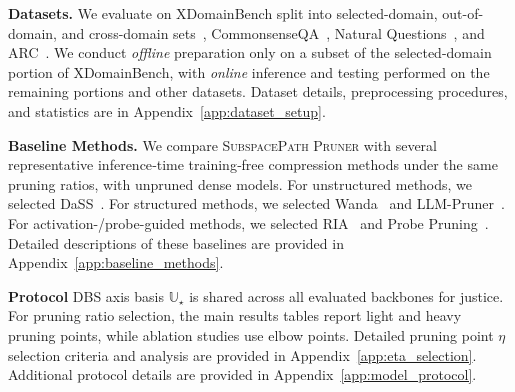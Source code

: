 \textbf{Datasets.}  
We evaluate on XDomainBench split into selected-domain, out-of-domain, and cross-domain sets~\cite{gong2026xdomainbench}, CommonsenseQA~\cite{talmor2019commonsenseqa}, Natural Questions~\cite{kwiatkowski2019natural}, and ARC~\cite{clark2018arc}. We conduct \emph{offline} preparation only on a subset of the selected-domain portion of XDomainBench, with \emph{online} inference and testing performed on the remaining portions and other datasets. Dataset details, preprocessing procedures, and statistics are in Appendix~\ref{app:dataset_setup}.

\textbf{Baseline Methods.}  
We compare \textsc{SubspacePath Pruner} with several representative inference‑time training‑free compression methods under the same pruning ratios, with unpruned dense models. For unstructured methods, we selected 
DaSS~\cite{guo2024dass}. For structured methods, we selected Wanda~\cite{sun2023wanda} and LLM-Pruner~\cite{llmpruner2023}.
For activation-/probe-guided methods, we selected RIA~\cite{zhang2024ria} and Probe Pruning~\cite{le2025probe}. Detailed descriptions of these baselines are provided in Appendix~\ref{app:baseline_methods}. 

\textbf{Protocol}
DBS axis basis $\mathbb{U}_\star$ is shared across all evaluated backbones for justice.
For pruning ratio selection, the main results tables report light and heavy pruning points, while ablation studies use elbow points.
Detailed pruning point $\eta$ selection criteria and analysis are provided in Appendix~\ref{app:eta_selection}.
Additional protocol details are provided in Appendix~\ref{app:model_protocol}.

